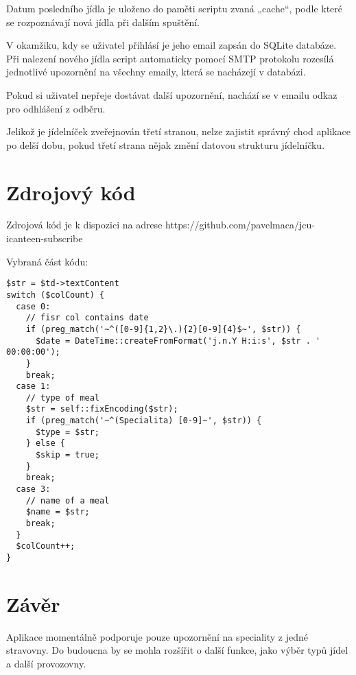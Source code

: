 \documentclass[a4]{article}
\begin{document}
Datum posledního jídla je uloženo do paměti scriptu zvaná „cache“, podle které se rozpoznávají nová jídla při dalším spuštění.

V okamžiku, kdy se uživatel přihlásí je jeho email zapsán do SQLite databáze. Při nalezení nového jídla script automaticky pomocí SMTP protokolu rozesílá jednotlivé upozornění na všechny emaily, která se nacházejí v databázi.

Pokud si uživatel nepřeje dostávat další upozornění, nachází se v emailu odkaz pro odhlášení z odběru.

Jelikož je jídelníček zveřejnován třetí stranou, nelze zajistit správný chod aplikace po delší dobu, pokud třetí strana nějak změní datovou strukturu jídelníčku.

\section{Zdrojový kód}
Zdrojová kód je k dispozici na adrese https://github.com/pavelmaca/jcu-icanteen-subscribe 

Vybraná část kódu:
\lstset{language=PHP} 
\begin{lstlisting}
$str = $td->textContent
switch ($colCount) {
  case 0:
    // fisr col contains date
    if (preg_match('~^([0-9]{1,2}\.){2}[0-9]{4}$~', $str)) {
      $date = DateTime::createFromFormat('j.n.Y H:i:s', $str . ' 00:00:00');
    }
    break;
  case 1:
    // type of meal
    $str = self::fixEncoding($str);
    if (preg_match('~^(Specialita) [0-9]~', $str)) {
      $type = $str;
    } else {
      $skip = true;
    }
    break;
  case 3:
    // name of a meal
    $name = $str;
    break;
  }
  $colCount++;
}
\end{lstlisting}



\section{Závěr}
Aplikace momentálně podporuje pouze upozornění na speciality z jedné stravovny. Do budoucna by se mohla rozšířit o další funkce, jako výběr typů jídel a další provozovny.
\end{document}
